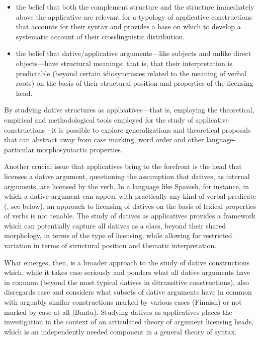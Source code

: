 \documentclass[output=paper,colorlinks,citecolor=brown,nonflat]{./langscibook}
\begin{document}
\begin{itemize}
\item \begin{styleListParagraph}
the belief that both the complement structure and the structure immediately above the applicative are relevant for a typology of applicative constructions that accounts for their syntax and provides a base on which to develop a systematic account of their crosslinguistic distribution.
\end{styleListParagraph}
\item \begin{styleListParagraph}
the belief that dative/applicative arguments—like subjects and unlike direct objects—have structural meanings; that is, that their interpretation is predictable (beyond certain idiosyncrasies related to the meaning of verbal roots) on the basis of their structural position and properties of the licensing head. 
\end{styleListParagraph}
\end{itemize}

By studying dative structures as applicatives—that is, employing the theoretical, empirical and methodological tools employed for the study of applicative constructions—it is possible to explore generalizations and theoretical proposals that can abstract away from case marking, word order and other language-particular morphosyntactic properties. 

Another crucial issue that applicatives bring to the forefront is the head that licenses a dative argument, questioning the assumption that datives, as internal arguments, are licensed by the verb. In a language like Spanish, for instance, in which a dative argument can appear with practically any kind of verbal predicate (\citealt{Cuervo2003}, see  below), an approach to licensing of datives on the basis of lexical properties of verbs is not tenable. The study of datives as applicatives provides a framework which can potentially capture all datives as a class, beyond their shared morphology, in terms of the type of licensing, while allowing for restricted variation in terms of structural position and thematic interpretation. 

What emerges, then, is a broader approach to the study of dative constructions which, while it takes case seriously and ponders what all dative arguments have in common (beyond the most typical datives in ditransitive constructions), also disregards case and considers what subsets of dative arguments have in common with arguably similar constructions marked by various cases (Finnish) or not marked by case at all (Bantu). 
Studying datives as applicatives places the investigation in the context of an articulated theory of argument licensing heads, which is an independently needed component in a general theory of syntax.
\end{document}
